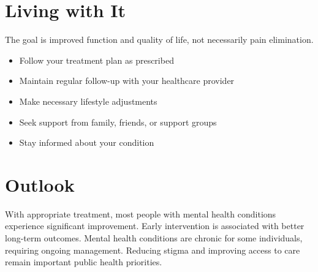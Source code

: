 \section{Living with It}
The goal is improved function and quality of life, not necessarily pain elimination.

\begin{itemize}[noitemsep]
  \item Follow your treatment plan as prescribed
  \item Maintain regular follow-up with your healthcare provider
  \item Make necessary lifestyle adjustments
  \item Seek support from family, friends, or support groups
  \item Stay informed about your condition
\end{itemize}
\section{Outlook}
With appropriate treatment, most people with mental health conditions experience significant improvement. Early intervention is associated with better long-term outcomes. Mental health conditions are chronic for some individuals, requiring ongoing management. Reducing stigma and improving access to care remain important public health priorities.
